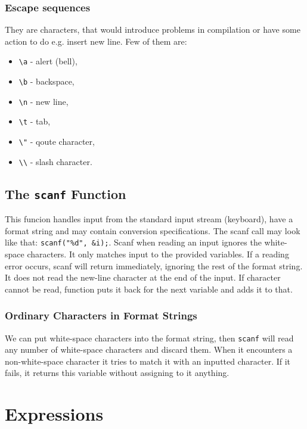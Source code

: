 \documentclass[openany]{book}
\begin{document}
    \subsection*{Escape sequences}
    They are characters, that would introduce problems in compilation or have some action to do e.g. insert new line. Few of them are:
    \begin{itemize}
        \item \texttt{\textbackslash a} - alert (bell),
        \item \texttt{\textbackslash b} - backspace,
        \item \texttt{\textbackslash n} - new line,
        \item \texttt{\textbackslash t} - tab,
        \item \texttt{\textbackslash "} - qoute character,
        \item \texttt{\textbackslash\textbackslash} - slash character.
    \end{itemize}

    \section{The \texttt{scanf} Function}
    This funcion handles input from the standard input stream (keyboard),  have a format string and may contain conversion specifications. The scanf call may look like that: \texttt{scanf("\%d", \&i);}. Scanf when reading an input ignores the white-space characters. It only matches input to the provided variables. If a reading error occurs, scanf will return immediately, ignoring the rest of the format string. It does not read the new-line character at the end of the input. If character cannot be read, function puts it back for the next variable and adds it to that.

    \subsection*{Ordinary Characters in Format Strings}
    We can put white-space characters into the format string, then \texttt{scanf} will read any number of white-space characters and discard them. When it encounters a non-white-space character it tries to match it with an inputted character. If it fails, it returns this variable without assigning to it anything.



    \chapter{Expressions}
\end{document}
